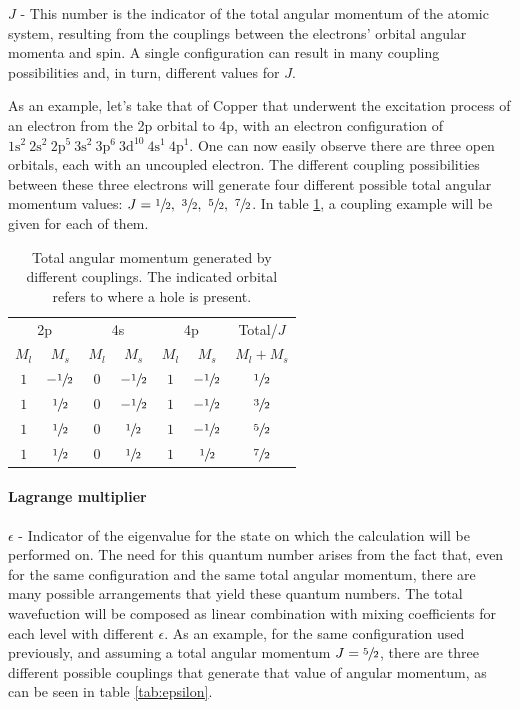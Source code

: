$J$ - This number is the indicator of the total angular momentum of the atomic system, resulting from the couplings between the electrons'  orbital angular momenta and spin. A single configuration can result in many coupling possibilities and, in turn, different values for $J$.

As an example, let's take that of Copper that underwent the excitation process of an electron from the 2p orbital to 4p, with an electron configuration of $1\text{s}^2\ 2\text{s}^2\ 2\text{p}^5\ 3\text{s}^2\ 3\text{p}^6\ 3\text{d}^{10}\ 4\text{s}^1\  4\text{p}^1 $. One can now easily observe there are three open orbitals, each with an uncoupled electron. The different coupling possibilities between these three electrons will generate four different possible total angular momentum values: $J=\sfrac{1}{2},\ \sfrac{3}{2},\ \sfrac{5}{2},\ \sfrac{7}{2}$. In table \ref{tab:tot_ang_mom}, a coupling example will be given for each of them.


\begin{table}[h!]
    \centering
    \caption{Total angular momentum generated by different couplings. The indicated orbital refers to where a hole is present.}
    \label{tab:tot_ang_mom}
    \begin{tabular}{cc|cc|cc|c}
        \toprule \multicolumn{2}{c|}{2p}&\multicolumn{2}{c|}{4s}&\multicolumn{2}{c|}{4p}&Total/$J$\\
        $M_l$ & $M_s$ & $M_l$&$M_s$&$M_l$&$M_s$&$M_l+M_s$\\\midrule
        $1$&$-\sfrac{1}{2}$&$0$&$-\sfrac{1}{2}$&$1$&$-\sfrac{1}{2}$&$\sfrac{1}{2}$\\
        $1$&$\sfrac{1}{2}$&$0$&$-\sfrac{1}{2}$&$1$&$-\sfrac{1}{2}$&$\sfrac{3}{2}$\\
        $1$&$\sfrac{1}{2}$&$0$&$\sfrac{1}{2}$&$1$&$-\sfrac{1}{2}$&$\sfrac{5}{2}$\\
        $1$&$\sfrac{1}{2}$&$0$&$\sfrac{1}{2}$&$1$&$\sfrac{1}{2}$&$\sfrac{7}{2}$\\\bottomrule
    \end{tabular}
\end{table}

\paragraph{Lagrange multiplier} $\epsilon$ - Indicator of the eigenvalue for the state on which the calculation will be performed on. The need for this quantum number arises from the fact that, even for the same configuration and the same total angular momentum, there are many possible arrangements that yield these quantum numbers. The total wavefuction will be composed as linear combination with mixing coefficients for each level with different $\epsilon$. As an example, for the same configuration used previously, and assuming a total angular momentum $J=\sfrac{5}{2}$, there are three different possible couplings that generate that value of angular momentum, as can be seen in table \ref{tab:epsilon}.


